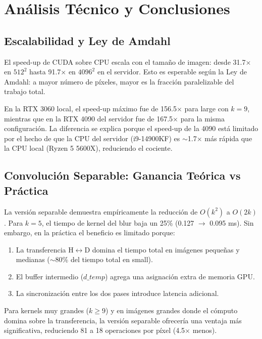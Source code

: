 \documentclass[12pt,a4paper]{article}
\begin{document}
\section{An\'alisis T\'ecnico y Conclusiones}

\subsection{Escalabilidad y Ley de Amdahl}

El speed-up de CUDA sobre CPU escala con el tama\~no de imagen: desde 31.7$\times$ en $512^2$ hasta 91.7$\times$ en $4096^2$ en el servidor. Esto es esperable seg\'un la Ley de Amdahl: a mayor n\'umero de p\'ixeles, mayor es la fracci\'on paralelizable del trabajo total.

En la RTX 3060 local, el speed-up m\'aximo fue de 156.5$\times$ para large con $k=9$, mientras que en la RTX 4090 del servidor fue de 167.5$\times$ para la misma configuraci\'on. La diferencia se explica porque el speed-up de la 4090 est\'a limitado por el hecho de que la CPU del servidor (i9-14900KF) es $\sim$1.7$\times$ m\'as r\'apida que la CPU local (Ryzen 5 5600X), reduciendo el cociente.

\subsection{Convoluci\'on Separable: Ganancia Te\'orica vs Pr\'actica}

La versi\'on separable demuestra emp\'iricamente la reducci\'on de $O(k^2)$ a $O(2k)$. Para $k=5$, el tiempo de kernel del blur baja un 25\% (0.127 $\rightarrow$ 0.095 ms). Sin embargo, en la pr\'actica el beneficio es limitado porque:

\begin{enumerate}
  \item La transferencia H$\leftrightarrow$D domina el tiempo total en im\'agenes peque\~nas y medianas ($\sim$80\% del tiempo total en small).
  \item El buffer intermedio ($d\_temp$) agrega una asignaci\'on extra de memoria GPU.
  \item La sincronizaci\'on entre los dos pases introduce latencia adicional.
\end{enumerate}

Para kernels muy grandes ($k \geq 9$) y en im\'agenes grandes donde el c\'omputo domina sobre la transferencia, la versi\'on separable ofrecer\'ia una ventaja m\'as significativa, reduciendo 81 a 18 operaciones por p\'ixel (4.5$\times$ menos).
\end{document}
